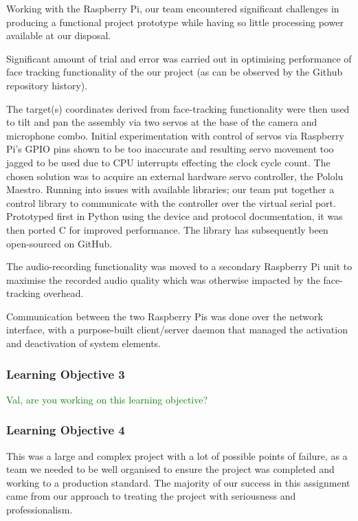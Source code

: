 \documentclass[11pt,a4paper,titlepage]{report}
\begin{document}
Working with the Raspberry Pi, our team encountered significant challenges in producing a functional project prototype while having so little processing power available at our disposal.

Significant amount of trial and error was carried out in optimising performance of face tracking functionality of the our project (as can be observed by the Github repository history). 

The target(s) coordinates derived from face-tracking functionality were then used to tilt and pan the assembly via two servos at the base of the camera and microphone combo. Initial experimentation with control of servos via Raspberry Pi's GPIO pins shown to be too inaccurate and resulting servo movement too jagged to be used due to CPU interrupts effecting the clock cycle count. The chosen solution was to acquire an external hardware servo controller, the Pololu Maestro. Running into issues with available libraries; our team put together a control library to communicate with the controller over the virtual  serial port. Prototyped first in Python using the device and protocol documentation, it was then ported C for improved performance. The library has subsequently been open-sourced on GitHub.

The audio-recording functionality was moved to a secondary Raspberry Pi unit to maximise the recorded audio quality which was otherwise impacted by the face-tracking overhead.

Communication between the two Raspberry Pis was done over the network interface, with a purpose-built client/server daemon that managed the activation and deactivation of system elements.

\subsubsection{Learning Objective 3}

\textcolor{green}{Val, are you working on this learning objective?}

\subsubsection{Learning Objective 4}

This was a large and complex project with a lot of possible points of failure, as a team we needed to be well organised to ensure the project was completed and working to a production standard. The majority of our success in this assignment came from our approach to treating the project with seriousness and professionalism.
\end{document}
